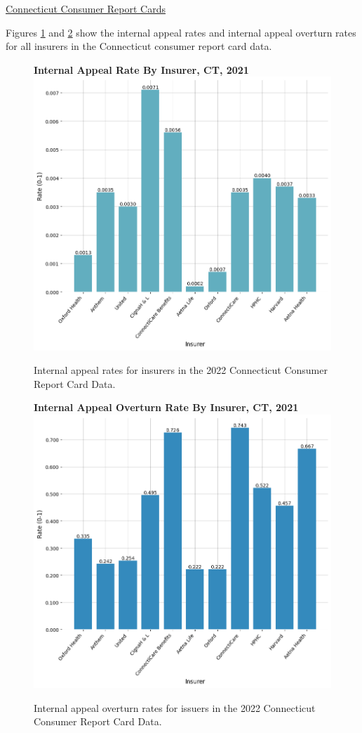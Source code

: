 \documentclass[12pt, a4paper,twoside]{report}
\theoremstyle{plain} %
\theoremstyle{definition} %
\theoremstyle{remark} %
\numberwithin{equation}{chapter}
\begin{document}
		\clearpage
		
		
		\underline{Connecticut Consumer Report Cards}

		Figures \ref{ctinternalappealratebyinsurer} and \ref{ctinternalappealoverturnratebyinsurer} show the internal appeal rates and internal appeal overturn rates for all insurers in the Connecticut consumer report card data.
		
		\begin{figure}[h!]
			\centering
			\textbf{Internal Appeal Rate By Insurer, CT, 2021}
			\includegraphics[width=.8\columnwidth]{images/ct_claims/appeal_rate_by_insurer.png}
			\caption{Internal appeal rates for insurers in the 2022 Connecticut Consumer Report Card Data.}
			\label{ctinternalappealratebyinsurer}
		\end{figure}
		
		
		\begin{figure}[h!]
			\centering
			\textbf{Internal Appeal Overturn Rate By Insurer, CT, 2021}
			\includegraphics[width=.8\columnwidth]{images/ct_claims/internal_appeal_overturn_rate_by_insurer.png}
			\caption{Internal appeal overturn rates for issuers in the 2022 Connecticut Consumer Report Card Data.}
			\label{ctinternalappealoverturnratebyinsurer}
		\end{figure}
		
\end{document}
